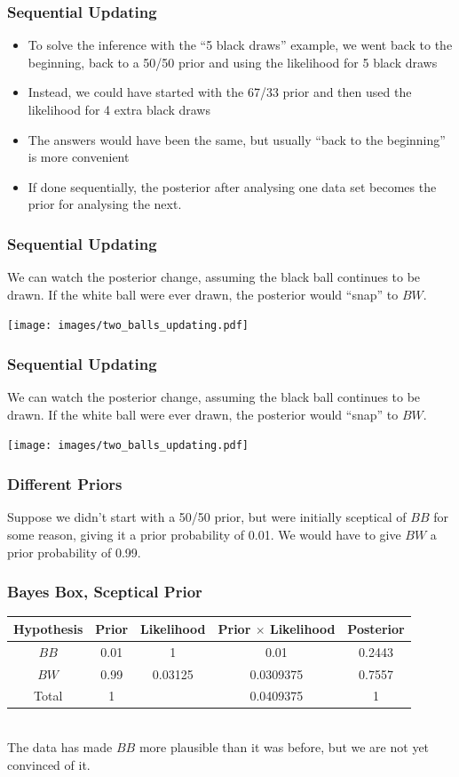 \documentclass{beamer}
\begin{document}
\begin{frame}
\frametitle{Sequential Updating}

\begin{itemize}
\item To solve the inference with the ``5 black draws'' example,
we went back to the beginning, back to a 50/50 prior and
using the likelihood for 5 black draws\pause
\item Instead, we could have started with the 67/33 prior and then used
the likelihood for 4 extra black draws\pause
\item  The answers would have been the same, but usually
``back to the beginning'' is more convenient\pause
\item If done sequentially, 
the posterior after analysing one data set becomes
the prior for analysing the next.
\end{itemize}


\end{frame}

\begin{frame}
\frametitle{Sequential Updating}
We can watch the posterior change, assuming the black ball continues to be
drawn. If the white ball were ever drawn, the posterior would ``snap'' to $BW$.

\centering
\texttt{[image: images/two\_balls\_updating.pdf]}

\end{frame}


\begin{frame}
\frametitle{Sequential Updating}
We can watch the posterior change, assuming the black ball continues to be
drawn. If the white ball were ever drawn, the posterior would ``snap'' to $BW$.

\centering
\texttt{[image: images/two\_balls\_updating.pdf]}

\end{frame}



\begin{frame}
\frametitle{Different Priors}
Suppose we didn't start with a 50/50 prior, but were initially sceptical of
$BB$ for some reason, giving it a prior probability of 0.01.
We would have to give $BW$ a prior probability of 0.99.

\end{frame}

\begin{frame}
\frametitle{Bayes Box, Sceptical Prior}
\begin{tabular}{|c|c|c|c|c|}
\hline
Hypothesis & Prior & Likelihood & Prior $\times$ Likelihood & Posterior \\
\hline
$BB$ & 0.01 & 1 & 0.01 & 0.2443 \\
$BW$ & 0.99 & 0.03125 & 0.0309375 & 0.7557 \\
\hline
Total & 1 & & 0.0409375 & 1\\
\hline
\end{tabular}
\pause
\\[0.5em]
The data has made $BB$ more plausible than it was before, but we are not yet
convinced of it.


\end{frame}
\end{document}
